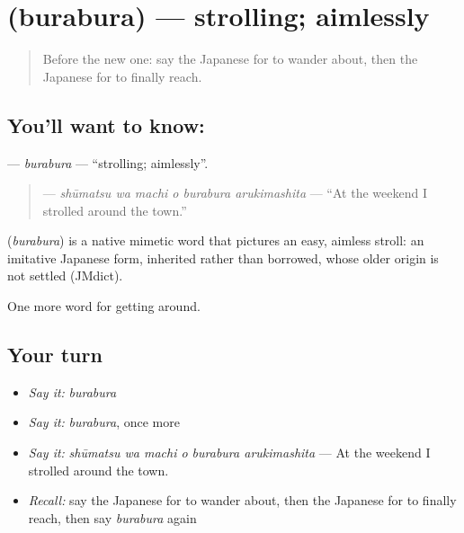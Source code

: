 \section[\texorpdfstring{\ja{ぶらぶら} (burabura)}{ぶらぶら (burabura)}]{ (burabura) — strolling; aimlessly}

\label{lesson:JA-C396-burabura}



\begin{quote}
Before the new one: say the Japanese for to wander about, then the Japanese for to finally reach.
\end{quote}

\subsection*{You'll want to know: }
\textbf{} — \emph{burabura} — \textquotedblleft{}strolling; aimlessly\textquotedblright{}.

\begin{quote}
\textbf{   } — \emph{shūmatsu wa machi o burabura arukimashita} — \textquotedblleft{}At the weekend I strolled around the town.\textquotedblright{}
\end{quote}

\begin{cousinweb}
\textbf{} (\emph{burabura}) is a native mimetic word that pictures an easy, aimless stroll: an imitative Japanese form, inherited rather than borrowed, whose older origin is not settled (JMdict).
\end{cousinweb}

\begin{grammarlens}[title={What you've built}]
One more word for getting around.
\end{grammarlens}

\subsection*{Your turn}
\begin{itemize}
\raggedright
  \item \emph{Say it:} \emph{burabura}
  \item \emph{Say it:} \emph{burabura}, once more
  \item \emph{Say it:} \emph{shūmatsu wa machi o burabura arukimashita} — At the weekend I strolled around the town.
  \item \emph{Recall:} say the Japanese for to wander about, then the Japanese for to finally reach, then say \emph{burabura} again
\end{itemize}

